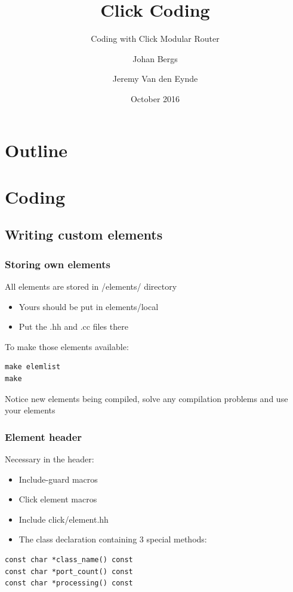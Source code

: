 \documentclass{beamer}
\title{Click Coding}
\subtitle{Coding with Click Modular Router}
\author{Johan Bergs \and Jeremy Van den Eynde}
\institute{University of Antwerp\\iMinds - MOSAIC Research Group}
\date{October 2016}
\begin{document}
\lstset{breakatwhitespace=true}
\lstset{language=C++}
\lstset{columns=fullflexible}
\lstset{keepspaces=true}
\lstset{breaklines=true,
        tabsize=3, 
        showstringspaces=false,
extendedchars=\true}

\begin{frame}[t]
\titlepage
\end{frame}


\section*{Outline}


\section{Coding}
\subsection{Writing custom elements} %
\label{sub:writing_custom_elements}

\begin{frame}[fragile]
	\frametitle{Storing own elements}
All elements are stored in /elements/ directory
\begin{itemize}
	\item Yours should be put in elements/local
	\item Put the .hh and .cc files there
\end{itemize}
To make those elements available:
\begin{lstlisting}
make elemlist
make
\end{lstlisting}
Notice new elements being compiled, solve any compilation problems and use your elements
\end{frame}


\begin{frame}[fragile]
\frametitle{Element header}
Necessary in the header:
\begin{itemize}
	\item Include-guard macros
	\item Click element macros
	\item Include click/element.hh
	\item The class declaration containing 3 special methods:
\end{itemize}
\begin{lstlisting}
const char *class_name() const
const char *port_count() const
const char *processing() const
\end{lstlisting}
\end{frame}
\end{document}
